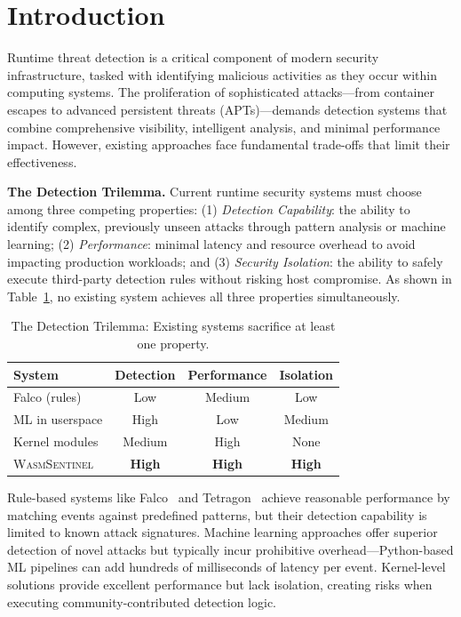 
\section{Introduction}
\label{sec:introduction}

Runtime threat detection is a critical component of modern security infrastructure, tasked with identifying malicious activities as they occur within computing systems.
The proliferation of sophisticated attacks---from container escapes to advanced persistent threats (APTs)---demands detection systems that combine comprehensive visibility, intelligent analysis, and minimal performance impact.
However, existing approaches face fundamental trade-offs that limit their effectiveness.

\textbf{The Detection Trilemma.}
Current runtime security systems must choose among three competing properties:
(1) \textit{Detection Capability}: the ability to identify complex, previously unseen attacks through pattern analysis or machine learning;
(2) \textit{Performance}: minimal latency and resource overhead to avoid impacting production workloads;
and (3) \textit{Security Isolation}: the ability to safely execute third-party detection rules without risking host compromise.
As shown in Table~\ref{tab:trilemma}, no existing system achieves all three properties simultaneously.

\begin{table}[t]
\centering
\caption{The Detection Trilemma: Existing systems sacrifice at least one property.}
\label{tab:trilemma}
\begin{tabular}{lccc}
\toprule
\textbf{System} & \textbf{Detection} & \textbf{Performance} & \textbf{Isolation} \\
\midrule
Falco (rules) & Low & Medium & Low \\
ML in userspace & High & Low & Medium \\
Kernel modules & Medium & High & None \\
\textsc{WasmSentinel} & \textbf{High} & \textbf{High} & \textbf{High} \\
\bottomrule
\end{tabular}
\end{table}

Rule-based systems like Falco~\cite{falco} and Tetragon~\cite{tetragon} achieve reasonable performance by matching events against predefined patterns, but their detection capability is limited to known attack signatures.
Machine learning approaches offer superior detection of novel attacks but typically incur prohibitive overhead---Python-based ML pipelines can add hundreds of milliseconds of latency per event.
Kernel-level solutions provide excellent performance but lack isolation, creating risks when executing community-contributed detection logic.

